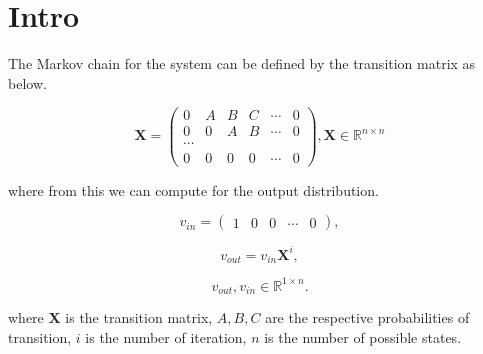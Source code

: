\documentclass{ieeeaccess}
\begin{document}
\maketitle
\section{Intro}

The Markov chain for the system can be defined by the transition matrix as below.

\begin{equation}
\mathbf{X}=\begin{pmatrix}
0 & A & B & C & \dotsb & 0 \\
0 & 0 & A & B & \dotsb & 0 \\
\dotsb\\
0 & 0 & 0 & 0 & \dotsb & 0
\end{pmatrix},
\mathbf{X} \in \mathbb{R}^{n \times n}

\end{equation}

where from this we can compute for the output distribution. 

\begin{equation}
	v_{in} = \begin{pmatrix}1&0&0&\dotsb&0\end{pmatrix},
\end{equation}

\begin{equation}
	v_{out} = v_{in}\mathbf{X}^{i},
\end{equation}

\begin{equation}
	v_{out},v_{in} \in \mathbb{R}^{1 \times n}.
\end{equation}

where $\mathbf{X}$ is the transition matrix, $A,B,C$ are the respective probabilities of transition, $i$ is the number of iteration, $n$ is the number of possible states. 
\end{document}
